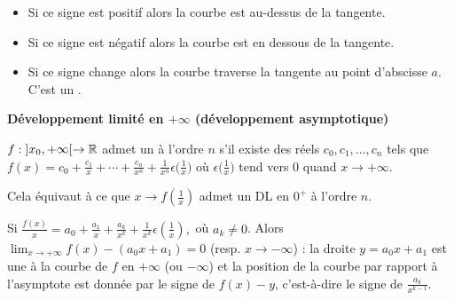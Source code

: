 \documentclass[10pt,class=article,crop=false]{standalone}
\begin{document}
\begin{multicols}{2}
\begin{itemize}
	\item Si ce signe est positif alors la courbe est au-dessus de la tangente.
	\item Si ce signe est négatif alors la courbe est en dessous de la tangente.
	\item Si ce signe change alors la courbe traverse
la tangente au point d'abscisse $a$. C'est un .	
\end{itemize}	


\textbf{Développement limité en $+\infty$ (développement asymptotique)}

$f : {}]x_0,+\infty[ \to \mathbb{R}$ admet un  à l'ordre $n$
s'il existe des réels $c_0,c_1,\ldots,c_n$ tels que
$f(x)=c_0+\frac{c_1}{x}+\cdots+\frac{c_n}{x^n}
+\frac{1}{x^n}\epsilon\big(\frac{1}{x}\big)$
où $\epsilon\big(\frac{1}{x}\big)$ tend vers $0$ quand $x\to+\infty$.

Cela équivaut à ce que $x \to f(\frac{1}{x})$ admet un DL en $0^+$ à l'ordre $n$.


\begin{proposition}
	Si 
	$\frac{f(x)}{x}= a_0 +\frac{a_1}{x}+\frac{a_k}{x^k}+\frac{1}{x^k}\epsilon(\frac{1}{x}),$
	où $a_k \neq 0$.
	Alors $\lim_{x\to+\infty} f(x)-(a_0x+a_1) =0$ (resp. $x\to -\infty$) : la droite $y= a_0x+a_1$ est une 
	à la courbe de $f$ en $+\infty$ (ou $-\infty$) et la position de la courbe par rapport à
	l'asymptote est donnée par le signe de $f(x)-y$, c'est-à-dire le signe de $\frac{a_k}{x^{k-1}}$.
\end{proposition}




\end{multicols}
\end{document}
